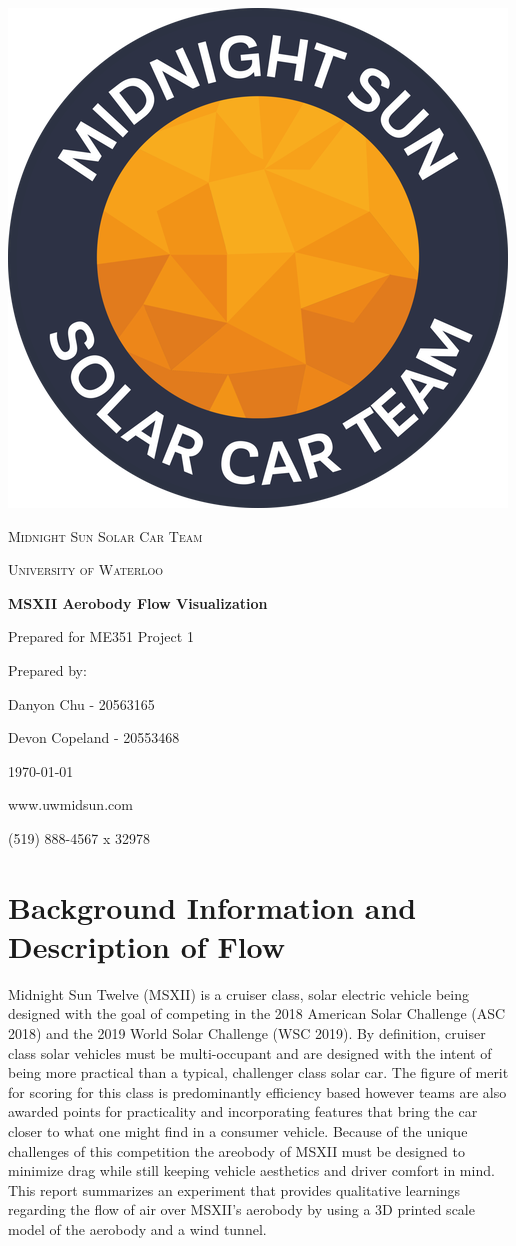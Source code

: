 \documentclass[12pt]{article}
\begin{document}
\begin{titlepage}
	\vspace*{2cm}
	\centering
	\includegraphics[width=.25\textwidth]{./images/midnightSunLogoCircle.png}\par
	\vspace{1.5cm}
	{\scshape\LARGE Midnight Sun Solar Car Team \par}
	{\scshape\large University of Waterloo\par}
	\vspace{2.2cm}
	{\huge\bfseries MSXII Aerobody Flow Visualization\par}
	\vspace{0.2cm}
	\large Prepared for ME351 Project 1 
	\vspace{2.2cm}	
	\par Prepared by:\par
	Danyon Chu - 20563165\par
	Devon Copeland - 20553468\par
    
	\vspace{0.6cm} 
	\today\par
	\vfill
	www.uwmidsun.com \par
	(519) 888-4567 x 32978
\end{titlepage}

\section{Background Information and Description of Flow}
Midnight Sun Twelve (MSXII) is a cruiser class, solar electric vehicle being designed with the goal of competing in the 2018 American Solar Challenge (ASC 2018) and the 2019 World Solar Challenge (WSC 2019). By definition, cruiser class solar vehicles must be multi-occupant and are designed with the intent of being more practical than a typical, challenger class solar car. The figure of merit for scoring for this class is predominantly efficiency based however teams are also awarded points for practicality and incorporating features that bring the car closer to what one might find in a consumer vehicle. Because of the unique challenges of this competition the areobody of MSXII must be designed to minimize drag while still keeping vehicle aesthetics and driver comfort in mind. This report summarizes an experiment that provides qualitative learnings regarding the flow of air over MSXII's aerobody by using a 3D printed scale model of the aerobody and a wind tunnel.
\end{document}
